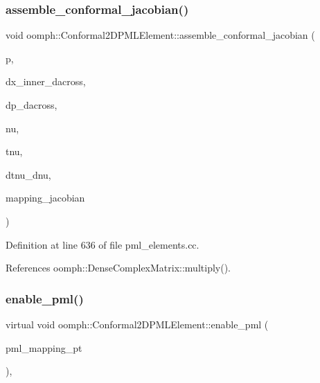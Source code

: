 \subsubsection{\texorpdfstring{assemble\+\_\+conformal\+\_\+jacobian()}{assemble\_conformal\_jacobian()}}
{\footnotesize\ttfamily void oomph\+::\+Conformal2\+D\+P\+M\+L\+Element\+::assemble\+\_\+conformal\+\_\+jacobian (\begin{DoxyParamCaption}\item[{const \hyperlink{classoomph_1_1Vector}{Vector}$<$ double $>$ \&}]{p,  }\item[{const \hyperlink{classoomph_1_1Vector}{Vector}$<$ double $>$ \&}]{dx\+\_\+inner\+\_\+dacross,  }\item[{const \hyperlink{classoomph_1_1Vector}{Vector}$<$ double $>$ \&}]{dp\+\_\+dacross,  }\item[{const double \&}]{nu,  }\item[{const std\+::complex$<$ double $>$ \&}]{tnu,  }\item[{const std\+::complex$<$ double $>$ \&}]{dtnu\+\_\+dnu,  }\item[{\hyperlink{classoomph_1_1DenseComplexMatrix}{Dense\+Complex\+Matrix} \&}]{mapping\+\_\+jacobian }\end{DoxyParamCaption})}



Definition at line 636 of file pml\+\_\+elements.\+cc.



References oomph\+::\+Dense\+Complex\+Matrix\+::multiply().

\mbox{\label{classoomph_1_1Conformal2DPMLElement_a8ac82beb6f246e627340df19ecd8c078}} 
\subsubsection{\texorpdfstring{enable\+\_\+pml()}{enable\_pml()}}
{\footnotesize\ttfamily virtual void oomph\+::\+Conformal2\+D\+P\+M\+L\+Element\+::enable\+\_\+pml (\begin{DoxyParamCaption}\item[{\hyperlink{classoomph_1_1UniaxialPMLMapping}{Uniaxial\+P\+M\+L\+Mapping} $\ast$}]{pml\+\_\+mapping\+\_\+pt }\end{DoxyParamCaption})\hspace{0.3cm}{\ttfamily [inline]}, {\ttfamily [virtual]}}



